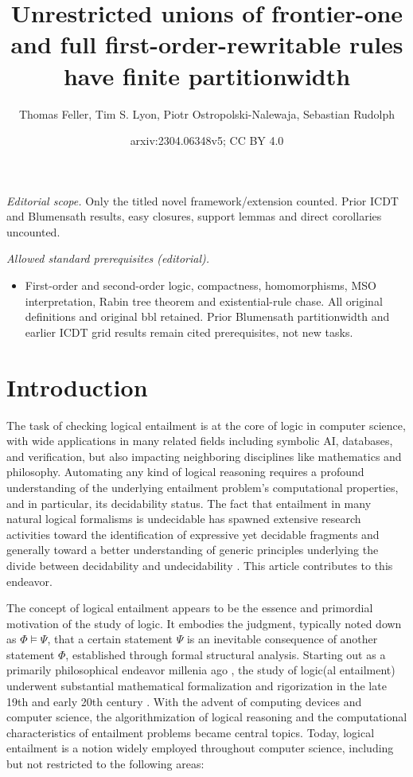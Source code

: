 \documentclass[10pt,a4paper]{amsart}
\title{Unrestricted unions of frontier-one and full first-order-rewritable rules have finite partitionwidth}
\author{Thomas Feller, Tim S. Lyon, Piotr Ostropolski-Nalewaja, Sebastian Rudolph}
\date{arxiv:2304.06348v5; CC BY 4.0}
\theoremstyle{definition}
\numberwithin{equation}{section}
\theoremstyle{plain}
\theoremstyle{definition}
\theoremstyle{myexample}
\theoremstyle{plain}
\theoremstyle{definition}
\begin{document}
\maketitle
\noindent\textit{Editorial scope.} Only the titled novel framework/extension counted. Prior ICDT and Blumensath results, easy closures, support lemmas and direct corollaries uncounted.\par\medskip
\noindent\textit{Allowed standard prerequisites (editorial).}\begin{itemize}
\item First-order and second-order logic, compactness, homomorphisms, MSO interpretation, Rabin tree theorem and existential-rule chase. All original definitions and original bbl retained. Prior Blumensath partitionwidth and earlier ICDT grid results remain cited prerequisites, not new tasks.
\end{itemize}\medskip

%
\section{Introduction}

The task of checking logical entailment is at the core of logic in computer science, with wide applications in many related fields including symbolic AI, databases, and veri\-fi\-ca\-tion, but also impacting neighboring disciplines like mathematics and philosophy.
Automating any kind of logical reasoning 
requires a profound understanding of the underlying entailment problem's computational properties, and in particular, its de\-ci\-da\-bi\-li\-ty status. The fact that entailment in many natural logical formalisms is undecidable has spawned  extensive research activities toward the identification of expressive yet decidable fragments and generally toward a better understanding of generic principles underlying the divide between decidability and undecidability \cite{BorgerGG1997,Vardi96,Gradel01,PrattHartmann23}. This article contributes to this endeavor.

\medskip

The concept of logical entailment appears to be the essence and primordial motivation of the study of logic. It embodies the judgment, typically noted down as $\Phi \models \Psi$, that a certain statement $\Psi$ is an inevitable consequence of another statement $\Phi$, established through formal structural analysis. Starting out as a primarily philosophical endeavor  millenia ago \cite{PriorAnalytics}, the study of logic(\hspace{-1pt}al entailment) underwent substantial mathematical formalization and rigorization in the late 19th and early 20th century \cite{Boole1854,Frege1879,Tarski1943}. With the advent of computing devices and computer science, the algorithmization of logical reasoning and the computational characteristics of entailment problems became central topics. Today, logical entailment is a notion widely employed throughout computer science, including but not restricted to the following areas:      
\end{document}
